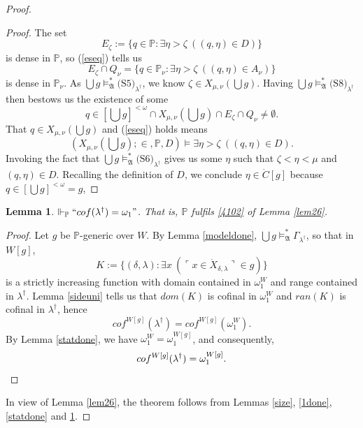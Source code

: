 \documentclass[12pt, twoside]{memoir}
\numberwithin{equation}{section}
\newtheorem{lem}[thm]{Lemma}
\theoremstyle{definition}
\theoremstyle{remark}
\theoremstyle{definition}
\theoremstyle{definition}
\theoremstyle{definition}
\theoremstyle{remark}
\begin{document}
\begin{proof}
\begin{proof}
The set $$E_{\zeta} := \{q \in \mathbb{P} : \exists \eta > \zeta \ ((q, \eta) \in D)\}$$ is dense in $\mathbb{P}$, so (\ref{eseq}) tells us $$E_{\zeta} \cap Q_{\nu} = \{q \in \mathbb{P}_{\nu} : \exists \eta > \zeta \ ((q, \eta) \in A_{\nu})\}$$ is dense in $\mathbb{P}_{\nu}$. As $\bigcup g \models^*_{\mathfrak{A}} \text{(S5)}_{\lambda^{\dagger}}$, we know $\zeta \in X_{\mu, \nu}(\bigcup g)$. Having $\bigcup g \models^*_{\mathfrak{A}} \text{(S8)}_{\lambda^{\dagger}}$ then bestows us the existence of some $$q \in [\bigcup g]^{< \omega} \cap X_{\mu, \nu}(\bigcup g) \cap E_{\zeta} \cap Q_{\nu} \neq \emptyset.$$ That $q \in X_{\mu, \nu}(\bigcup g)$ and (\ref{eseq}) holds means $$(X_{\mu, \nu}(\bigcup g); \in, \mathbb{P}, D) \models \exists \eta > \zeta \ ((q, \eta) \in D).$$ Invoking the fact that $\bigcup g \models^*_{\mathfrak{A}} \text{(S6)}_{\lambda^{\dagger}}$ gives us some $\eta$ such that $\zeta < \eta < \mu$ and $(q, \eta) \in D$. Recalling the definition of $D$, we conclude $\eta \in \dot{C}[g]$ because $q \in [\bigcup g]^{< \omega} = g$, 
\end{proof}

\begin{lem}\label{2done}
$\Vdash_{\mathbb{P}} ``cof(\lambda^{\dagger}) = \omega_1"$. That is, $\mathbb{P}$ fulfils \ref{4102} of Lemma \ref{lem26}.
\end{lem}

\begin{proof}
Let $g$ be $\mathbb{P}$-generic over $W$. By Lemma \ref{modeldone}, $\bigcup g \models^*_{\mathfrak{A}} \Gamma_{\lambda^{\dagger}}$, so that in $W[g]$, $$K := \{(\delta, \lambda) : \exists x \ (\ulcorner x \in \dot{X}_{\delta, \lambda} \urcorner \in g)\}$$ is a strictly increasing function with domain contained in $\omega_1^W$ and range contained in $\lambda^{\dagger}$. Lemma \ref{sideuni} tells us that $dom(K)$ is cofinal in $\omega_1^W$ and $ran(K)$ is cofinal in $\lambda^{\dagger}$, hence $$cof^{W[g]}(\lambda^{\dagger}) = cof^{W[g]}(\omega_1^W).$$ By Lemma \ref{statdone}, we have $\omega_1^W = \omega_1^{W[g]}$, and consequently, 
\begin{equation*}
    cof^{W[g]}(\lambda^{\dagger}) = \omega_1^{W[g]}.
    \qedhere
\end{equation*}
\end{proof}

In view of Lemma \ref{lem26}, the theorem follows from Lemmas \ref{size}, \ref{1done}, \ref{statdone} and \ref{2done}.
\end{proof}
\end{document}
